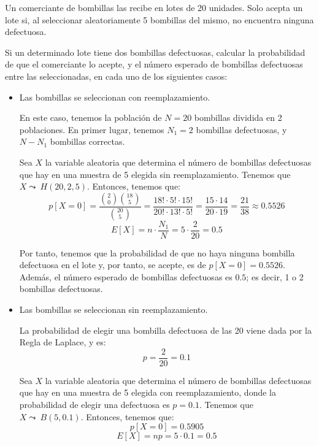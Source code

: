 \begin{ejercicio}
     Un comerciante de bombillas las recibe en lotes de 20 unidades. Solo acepta un lote si, al seleccionar aleatoriamente 5 bombillas del mismo, no encuentra ninguna defectuosa.

     Si un determinado lote tiene dos bombillas defectuosas, calcular la probabilidad de que el comerciante lo acepte, y el número esperado de bombillas defectuosas entre las seleccionadas, en cada uno de los siguientes casos:
     \begin{itemize}
         \item Las bombillas se seleccionan con reemplazamiento.

        En este caso, tenemos la población de $N=20$ bombillas dividida en 2 poblaciones. En primer lugar, tenemos $N_1=2$ bombillas defectuosas, y $N-N_1$ bombillas correctas.

        Sea $X$ la variable aleatoria que determina el número de bombillas defectuosas que hay en una muestra de 5 elegida sin reemplazamiento. Tenemos que $X\leadsto~H(20, 2, 5)$. Entonces, tenemos que:
        \begin{equation*}
            p[X=0]=\frac{\binom{2}{0}\binom{18}{5}}{\binom{20}{5}} = \frac{18!\cdot 5!\cdot 15!}{20!\cdot 13!\cdot 5!} = \frac{15\cdot 14}{20\cdot 19} = \frac{21}{38} \approx 0.5526
        \end{equation*}
        \begin{equation*}
            E[X]=n\cdot \frac{N_1}{N} = 5\cdot \frac{2}{20} = 0.5
        \end{equation*}

        Por tanto, tenemos que la probabilidad de que no haya ninguna bombilla defectuosa en el lote y, por tanto, se acepte, es de $p[X=0]=0.5526$. Además, el número esperado de bombillas defectuosas es $0.5$; es decir, 1 o 2 bombillas defectuosas.

         
         \item Las bombillas se seleccionan sin reemplazamiento.

         La probabilidad de elegir una bombilla defectuosa de las 20 viene dada por la Regla de Laplace, y es:
         \begin{equation*}
             p=\frac{2}{20} = 0.1
         \end{equation*}

         Sea $X$ la variable aleatoria que determina el número de bombillas defectuosas que hay en una muestra de 5 elegida con reemplazamiento, donde la probabilidad de elegir una defectuosa es $p=0.1$. Tenemos que $X\leadsto~B(5, 0.1)$. Entonces, tenemos que:
        \begin{equation*}
            p[X=0]=0.5905
        \end{equation*}
        \begin{equation*}
            E[X]=np=5\cdot 0.1=0.5
        \end{equation*}


\end{itemize}
\end{ejercicio}
